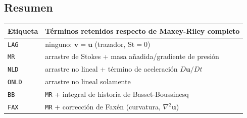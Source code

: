 \documentclass[11pt]{article}
\begin{document}
\subsection{Resumen}

\begin{center}
\begin{tabular}{ll}
\hline
Etiqueta & Términos retenidos respecto de Maxey-Riley completo \\
\hline
\texttt{LAG}  & ninguno: $\mathbf{v}=\mathbf{u}$ (trazador, $\mathrm{St}=0$) \\
\texttt{MR}   & arrastre de Stokes + masa añadida/gradiente de presión \\
\texttt{NLD}  & arrastre no lineal + término de aceleración $D\mathbf{u}/Dt$ \\
\texttt{ONLD} & arrastre no lineal solamente \\
\texttt{BB}   & \texttt{MR} + integral de historia de Basset-Boussinesq \\
\texttt{FAX}  & \texttt{MR} + corrección de Faxén (curvatura, $\nabla^2\mathbf{u}$) \\
\hline
\end{tabular}
\end{center}
\end{document}
